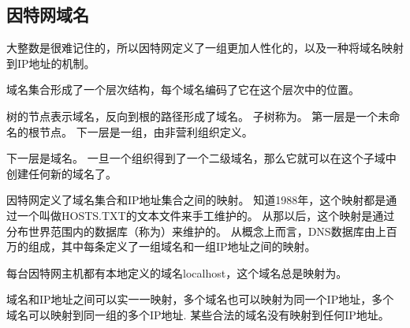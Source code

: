 {    \subsection{因特网域名}
    {
        大整数是很难记住的，所以因特网定义了一组更加人性化的，以及一种将域名映射到IP地址的机制。

        域名集合形成了一个层次结构，每个域名编码了它在这个层次中的位置。

        树的节点表示域名，反向到根的路径形成了域名。
        子树称为。
        第一层是一个未命名的根节点。
        下一层是一组，由非营利组织定义。

        下一层是域名。
        一旦一个组织得到了一个二级域名，那么它就可以在这个子域中创建任何新的域名了。

        因特网定义了域名集合和IP地址集合之间的映射。
        知道1988年，这个映射都是通过一个叫做HOSTS.TXT的文本文件来手工维护的。
        从那以后，这个映射是通过分布世界范围内的数据库（称为）来维护的。
        从概念上而言，DNS数据库由上百万的组成，其中每条定义了一组域名和一组IP地址之间的映射。

        每台因特网主机都有本地定义的域名localhost，这个域名总是映射为。

        域名和IP地址之间可以实一一映射，多个域名也可以映射为同一个IP地址，多个域名可以映射到同一组的多个IP地址.
        某些合法的域名没有映射到任何IP地址。
    }
}
